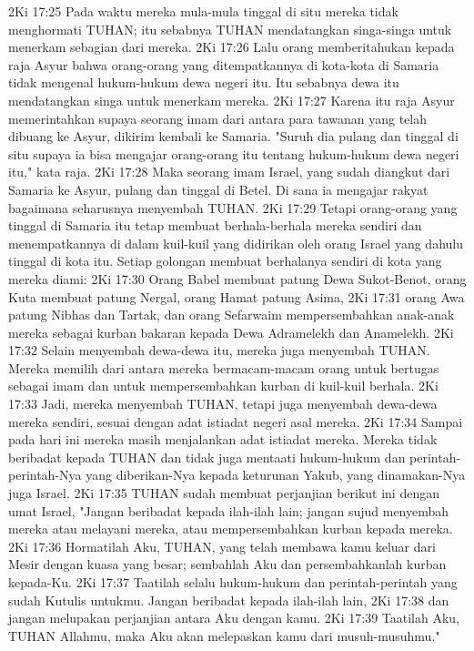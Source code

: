 2Ki 17:25  Pada waktu mereka mula-mula tinggal di situ mereka tidak menghormati TUHAN; itu sebabnya TUHAN mendatangkan singa-singa untuk menerkam sebagian dari mereka.
2Ki 17:26  Lalu orang memberitahukan kepada raja Asyur bahwa orang-orang yang ditempatkannya di kota-kota di Samaria tidak mengenal hukum-hukum dewa negeri itu. Itu sebabnya dewa itu mendatangkan singa untuk menerkam mereka.
2Ki 17:27  Karena itu raja Asyur memerintahkan supaya seorang imam dari antara para tawanan yang telah dibuang ke Asyur, dikirim kembali ke Samaria. "Suruh dia pulang dan tinggal di situ supaya ia bisa mengajar orang-orang itu tentang hukum-hukum dewa negeri itu," kata raja.
2Ki 17:28  Maka seorang imam Israel, yang sudah diangkut dari Samaria ke Asyur, pulang dan tinggal di Betel. Di sana ia mengajar rakyat bagaimana seharusnya menyembah TUHAN.
2Ki 17:29  Tetapi orang-orang yang tinggal di Samaria itu tetap membuat berhala-berhala mereka sendiri dan menempatkannya di dalam kuil-kuil yang didirikan oleh orang Israel yang dahulu tinggal di kota itu. Setiap golongan membuat berhalanya sendiri di kota yang mereka diami:
2Ki 17:30  Orang Babel membuat patung Dewa Sukot-Benot, orang Kuta membuat patung Nergal, orang Hamat patung Asima,
2Ki 17:31  orang Awa patung Nibhas dan Tartak, dan orang Sefarwaim mempersembahkan anak-anak mereka sebagai kurban bakaran kepada Dewa Adramelekh dan Anamelekh.
2Ki 17:32  Selain menyembah dewa-dewa itu, mereka juga menyembah TUHAN. Mereka memilih dari antara mereka bermacam-macam orang untuk bertugas sebagai imam dan untuk mempersembahkan kurban di kuil-kuil berhala.
2Ki 17:33  Jadi, mereka menyembah TUHAN, tetapi juga menyembah dewa-dewa mereka sendiri, sesuai dengan adat istiadat negeri asal mereka.
2Ki 17:34  Sampai pada hari ini mereka masih menjalankan adat istiadat mereka. Mereka tidak beribadat kepada TUHAN dan tidak juga mentaati hukum-hukum dan perintah-perintah-Nya yang diberikan-Nya kepada keturunan Yakub, yang dinamakan-Nya juga Israel.
2Ki 17:35  TUHAN sudah membuat perjanjian berikut ini dengan umat Israel, "Jangan beribadat kepada ilah-ilah lain; jangan sujud menyembah mereka atau melayani mereka, atau mempersembahkan kurban kepada mereka.
2Ki 17:36  Hormatilah Aku, TUHAN, yang telah membawa kamu keluar dari Mesir dengan kuasa yang besar; sembahlah Aku dan persembahkanlah kurban kepada-Ku.
2Ki 17:37  Taatilah selalu hukum-hukum dan perintah-perintah yang sudah Kutulis untukmu. Jangan beribadat kepada ilah-ilah lain,
2Ki 17:38  dan jangan melupakan perjanjian antara Aku dengan kamu.
2Ki 17:39  Taatilah Aku, TUHAN Allahmu, maka Aku akan melepaskan kamu dari musuh-musuhmu."
